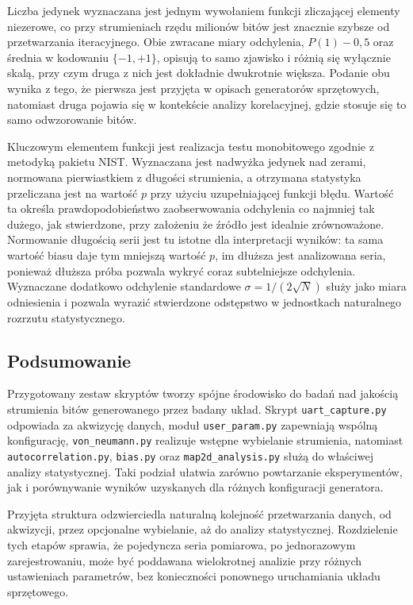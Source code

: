 Liczba jedynek wyznaczana jest jednym wywołaniem funkcji zliczającej elementy niezerowe,
co przy strumieniach rzędu milionów bitów jest znacznie szybsze od przetwarzania
iteracyjnego. Obie zwracane miary odchylenia, $P(1)-0{,}5$ oraz średnia w kodowaniu
$\{-1,+1\}$, opisują to samo zjawisko i różnią się wyłącznie skalą, przy czym druga
z nich jest dokładnie dwukrotnie większa. Podanie obu wynika z tego, że pierwsza jest
przyjęta w opisach generatorów sprzętowych, natomiast druga pojawia się w kontekście
analizy korelacyjnej, gdzie stosuje się to samo odwzorowanie bitów.

Kluczowym elementem funkcji jest realizacja testu monobitowego zgodnie z metodyką
pakietu NIST. Wyznaczana jest nadwyżka jedynek nad zerami, normowana pierwiastkiem
z długości strumienia, a otrzymana statystyka przeliczana jest na wartość $p$ przy użyciu
uzupełniającej funkcji błędu. Wartość ta określa prawdopodobieństwo zaobserwowania
odchylenia co najmniej tak dużego, jak stwierdzone, przy założeniu że źródło jest
idealnie zrównoważone. Normowanie długością serii jest tu istotne dla interpretacji
wyników: ta sama wartość biasu daje tym mniejszą wartość $p$, im dłuższa jest analizowana
seria, ponieważ dłuższa próba pozwala wykryć coraz subtelniejsze odchylenia. Wyznaczane
dodatkowo odchylenie standardowe $\sigma = 1/(2\sqrt{N})$ służy jako miara odniesienia
i pozwala wyrazić stwierdzone odstępstwo w jednostkach naturalnego rozrzutu
statystycznego.

\subsection{Podsumowanie}

Przygotowany zestaw skryptów tworzy spójne środowisko do badań nad jakością
strumienia bitów generowanego przez badany układ. Skrypt \texttt{uart\_capture.py}
odpowiada za akwizycję danych, moduł \texttt{user\_param.py} zapewniają wspólną 
konfigurację, \texttt{von\_neumann.py} realizuje wstępne wybielanie strumienia, natomiast
\texttt{autocorrelation.py}, \texttt{bias.py} oraz \texttt{map2d\_analysis.py}
służą do właściwej analizy statystycznej. Taki podział ułatwia zarówno
powtarzanie eksperymentów, jak i porównywanie wyników uzyskanych dla różnych
konfiguracji generatora.

Przyjęta struktura odzwierciedla naturalną kolejność przetwarzania danych,
od akwizycji, przez opcjonalne wybielanie, aż do analizy statystycznej. Rozdzielenie
tych etapów sprawia, że pojedyncza seria pomiarowa, po jednorazowym zarejestrowaniu,
może być poddawana wielokrotnej analizie przy różnych ustawieniach parametrów, bez
konieczności ponownego uruchamiania układu sprzętowego.

